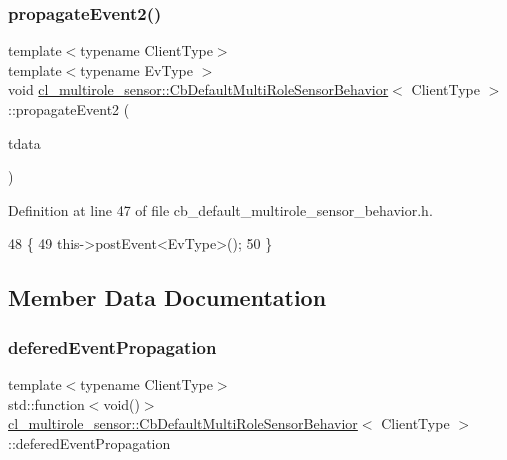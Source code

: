\subsubsection{\texorpdfstring{propagate\+Event2()}{propagateEvent2()}}
{\footnotesize\ttfamily template$<$typename Client\+Type$>$ \\
template$<$typename Ev\+Type $>$ \\
void \hyperlink{classcl__multirole__sensor_1_1CbDefaultMultiRoleSensorBehavior}{cl\+\_\+multirole\+\_\+sensor\+::\+Cb\+Default\+Multi\+Role\+Sensor\+Behavior}$<$ Client\+Type $>$\+::propagate\+Event2 (\begin{DoxyParamCaption}\item[{const ros\+::\+Timer\+Event \&}]{tdata }\end{DoxyParamCaption})\hspace{0.3cm}{\ttfamily [inline]}}



Definition at line 47 of file cb\+\_\+default\+\_\+multirole\+\_\+sensor\+\_\+behavior.\+h.


\begin{DoxyCode}
48   \{
49     this->postEvent<EvType>();
50   \}
\end{DoxyCode}


\subsection{Member Data Documentation}
\mbox{\label{classcl__multirole__sensor_1_1CbDefaultMultiRoleSensorBehavior_a18f86fd2fd9c3575b62a2c58953b7d33}} 
\subsubsection{\texorpdfstring{defered\+Event\+Propagation}{deferedEventPropagation}}
{\footnotesize\ttfamily template$<$typename Client\+Type$>$ \\
std\+::function$<$void()$>$ \hyperlink{classcl__multirole__sensor_1_1CbDefaultMultiRoleSensorBehavior}{cl\+\_\+multirole\+\_\+sensor\+::\+Cb\+Default\+Multi\+Role\+Sensor\+Behavior}$<$ Client\+Type $>$\+::defered\+Event\+Propagation}



